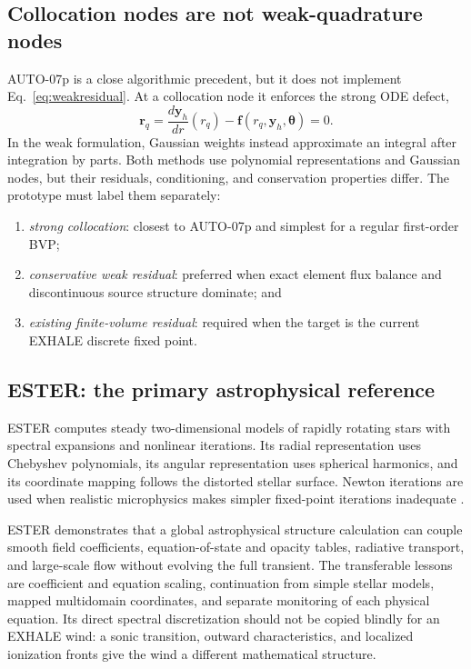 \documentclass[english,a4paper]{my_memo}
\newcommand{\vect}[1]{\mathbf{#1}}
\begin{document}
\subsection{Collocation nodes are not weak-quadrature nodes}

AUTO-07p is a close algorithmic precedent, but it does not implement
Eq.~\eqref{eq:weakresidual}.  At a collocation node it enforces the strong ODE
defect,
\begin{equation}
 \vect{r}_{q}=\frac{d\vect{y}_h}{dr}(r_q)
 -\vect{f}(r_q,\vect{y}_h,\boldsymbol{\theta})=0.
 \label{eq:collocationdefect}
\end{equation}
In the weak formulation, Gaussian weights instead approximate an integral after
integration by parts.  Both methods use polynomial representations and Gaussian
nodes, but their residuals, conditioning, and conservation properties differ.
The prototype must label them separately:
\begin{enumerate}
\item \emph{strong collocation}: closest to AUTO-07p and simplest for a regular
  first-order BVP;
\item \emph{conservative weak residual}: preferred when exact element flux
  balance and discontinuous source structure dominate; and
\item \emph{existing finite-volume residual}: required when the target is the
  current EXHALE discrete fixed point.
\end{enumerate}

\subsection{ESTER: the primary astrophysical reference}

ESTER computes steady two-dimensional models of rapidly rotating stars with
spectral expansions and nonlinear iterations.  Its radial representation uses
Chebyshev polynomials, its angular representation uses spherical harmonics, and
its coordinate mapping follows the distorted stellar surface.  Newton
iterations are used when realistic microphysics makes simpler fixed-point
iterations inadequate \cite{Rieutord2016}.

ESTER demonstrates that a global astrophysical structure calculation can couple
smooth field coefficients, equation-of-state and opacity tables, radiative
transport, and large-scale flow without evolving the full transient.  The
transferable lessons are coefficient and equation scaling, continuation from
simple stellar models, mapped multidomain coordinates, and separate monitoring
of each physical equation.  Its direct spectral discretization should not be
copied blindly for an EXHALE wind: a sonic transition, outward characteristics,
and localized ionization fronts give the wind a different mathematical
structure.
\end{document}
